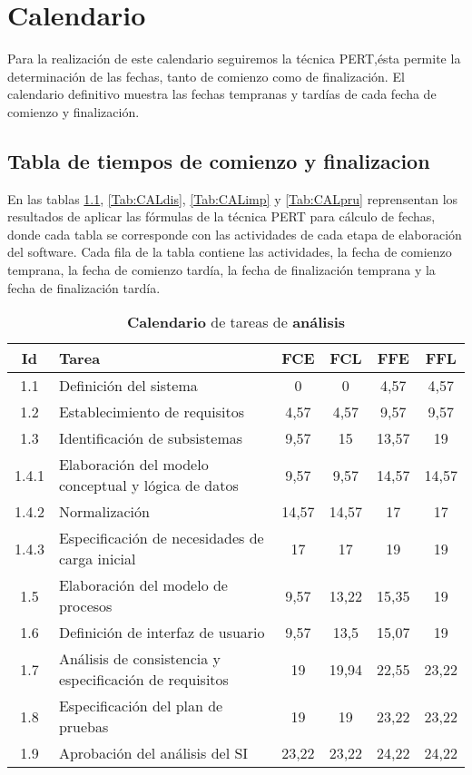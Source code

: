 \documentclass[11pt,a4paper,spanish,twoside]{report}
\begin{document}
\chapter{Calendario}
Para la realización de este calendario seguiremos la técnica PERT,ésta
permite la determinación de las fechas, tanto de comienzo como de
finalización. El calendario definitivo muestra las fechas tempranas y tardías
de cada fecha de comienzo y finalización.


\section{Tabla de tiempos de comienzo y finalizacion}
En las tablas \ref{Tab:CALana}, \ref{Tab:CALdis}, \ref{Tab:CALimp} y
\ref{Tab:CALpru} reprensentan los resultados de aplicar las fórmulas de la
técnica PERT para cálculo de fechas, donde cada tabla se corresponde con las
actividades de cada etapa de elaboración del software. Cada fila de la
tabla contiene las actividades, la fecha de comienzo temprana, la fecha
de comienzo tardía, la fecha de finalización temprana y la fecha de
finalización tardía.

\begin{table}[!h]
  \centering
  \begin{tabular}{|c||p{5.3cm}||c|c|c|c|}
    \hline
    \textbf{Id} & \textbf{Tarea} & \textbf{FCE} & \textbf{FCL} &
    \textbf{FFE} & \textbf{FFL}\\
    \hline
    1.1 & Definición del sistema & 0 & 0 & 4,57 & 4,57 \\
    \hline
    1.2 & Establecimiento de requisitos & 4,57 & 4,57 & 9,57  & 9,57 \\
    \hline
    1.3 & Identificación de subsistemas  & 9,57 & 15 & 13,57 & 19 \\
    \hline
    1.4.1 & Elaboración del modelo conceptual y lógica de datos & 9,57 &
    9,57 & 14,57 & 14,57 \\
    \hline
    1.4.2 & Normalización  & 14,57 & 14,57 & 17 & 17 \\
    \hline
    1.4.3 & Especificación de necesidades de carga inicial  & 17 & 17 & 19
    & 19 \\ 
    \hline
    1.5 & Elaboración del modelo de procesos & 9,57  & 13,22 & 15,35 & 19 \\
    \hline
    1.6 & Definición de interfaz de usuario  & 9,57 & 13,5 & 15,07 & 19 \\
    \hline
    1.7 & Análisis de consistencia y especificación de requisitos & 19 &
    19,94 & 22,55 & 23,22\\ 
    \hline
    1.8 & Especificación del plan de pruebas & 19 & 19 & 23,22 & 23,22\\
    \hline
    1.9 & Aprobación del análisis del SI & 23,22 & 23,22 & 24,22 & 24,22 \\
    \hline
  \end{tabular}
  \caption{\textbf{Calendario} de tareas de \textbf{análisis}}
  \label{Tab:CALana}
\end{table}
    
\end{document}

